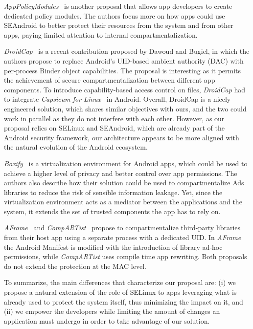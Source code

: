 {\em AppPolicyModules}~\cite{seapp_apm} is another proposal that
allows app developers to create dedicated policy modules. The authors
focus more on how apps could use SEAndroid to better protect their
resources from the system and from other apps, paying limited
attention to internal compartmentalization.

{\em DroidCap}~\cite{seapp_droidcap} is a recent contribution proposed
by Dawoud and Bugiel, in which the authors propose to replace
Android's UID-based ambient authority (DAC) with per-process Binder
object capabilities.  The proposal is interesting as it permits the
achievement of secure compartmentalization between different app
components. To introduce capability-based access control on files,
{\em DroidCap} had to integrate {\em Capsicum for
  Linux}~\cite{seapp_capsic} in Android. Overall, DroidCap is a nicely
engineered solution, which shares similar objectives with ours, and
the two could work in parallel as they do not interfere with each
other.  However, as our proposal relies on SELinux and SEAndroid,
which are already part of the Android security framework, our
architecture appears to be more aligned with the natural evolution of
the Android ecosystem.

{\em Boxify}~\cite{seapp_boxify} is a virtualization environment for
Android apps, which could be used to achieve a higher level of privacy
and better control over app permissions. The authors also describe how
their solution could be used to compartmentalize Ads libraries to
reduce the risk of sensible information leakage.  Yet, since the
virtualization environment acts as a mediator between the applications
and the system, it extends the set of trusted components the app has
to rely on.

{\em AFrame}~\cite{seapp_aframe} and {\em
  CompARTist}~\cite{seapp_10.1145/3133956.3134064} propose to
compartmentalize third-party libraries from their host app using a separate
process with a dedicated UID. In {\em AFrame} the Android Manifest is
modified with the introduction of library ad-hoc permissions, while
{\em CompARTist} uses compile time app rewriting. Both proposals do
not extend the protection at the MAC level.

To summarize, the main differences that characterize our proposal are:
(i) we propose a natural extension of the role of SELinux to apps
leveraging what is already used to protect the system itself, thus
minimizing the impact on it, and (ii) we empower the developers while
limiting the amount of changes an application must undergo in order to
take advantage of our solution.

